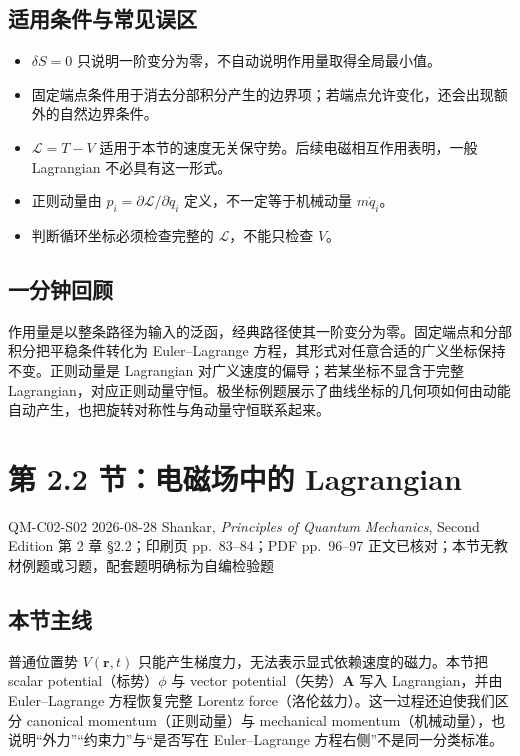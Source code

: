 \subsection{适用条件与常见误区}

\begin{itemize}[leftmargin=*]
  \item $\delta S=0$ 只说明一阶变分为零，不自动说明作用量取得全局最小值。
  \item 固定端点条件用于消去分部积分产生的边界项；若端点允许变化，还会出现额外的自然边界条件。
  \item $\mathcal L=T-V$ 适用于本节的速度无关保守势。后续电磁相互作用表明，一般 Lagrangian 不必具有这一形式。
  \item 正则动量由 $p_i=\partial\mathcal L/\partial\dot q_i$ 定义，不一定等于机械动量 $m\dot q_i$。
  \item 判断循环坐标必须检查完整的 $\mathcal L$，不能只检查 $V$。
\end{itemize}

\subsection{一分钟回顾}

作用量是以整条路径为输入的泛函，经典路径使其一阶变分为零。固定端点和分部积分把平稳条件转化为 Euler--Lagrange 方程，其形式对任意合适的广义坐标保持不变。正则动量是 Lagrangian 对广义速度的偏导；若某坐标不显含于完整 Lagrangian，对应正则动量守恒。极坐标例题展示了曲线坐标的几何项如何由动能自动产生，也把旋转对称性与角动量守恒联系起来。

\section{第 2.2 节：电磁场中的 Lagrangian}
\label{section:QM-C02-S02}

\studymeta
  {QM-C02-S02}
  {2026-08-28}
  {Shankar, \textit{Principles of Quantum Mechanics}, Second Edition}
  {第 2 章 \S 2.2；印刷页 pp.~83--84；PDF pp.~96--97}
  {正文已核对；本节无教材例题或习题，配套题明确标为自编检验题}

\subsection{本节主线}

普通位置势 $V(\bm r,t)$ 只能产生梯度力，无法表示显式依赖速度的磁力。本节把 scalar potential（标势）$\phi$ 与 vector potential（矢势）$\bm A$ 写入 Lagrangian，并由 Euler--Lagrange 方程恢复完整 Lorentz force（洛伦兹力）。这一过程还迫使我们区分 canonical momentum（正则动量）与 mechanical momentum（机械动量），也说明“外力”“约束力”与“是否写在 Euler--Lagrange 方程右侧”不是同一分类标准。

